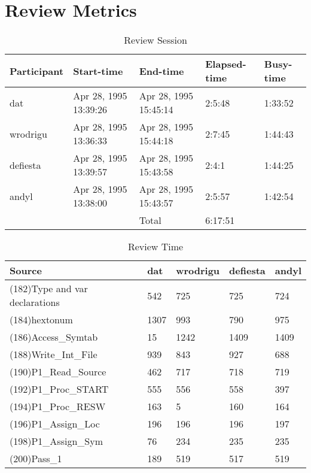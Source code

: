\section{Review Metrics}
\begin{table}[hb]
\begin{center}
\begin{tabular}{|l|l|l|l|l|}
\hline
Participant & Start-time & End-time & Elapsed-time & Busy-time \\
\hline
dat & Apr 28, 1995 13:39:26 & Apr 28, 1995 15:45:14 & 2:5:48 & 1:33:52 \\
wrodrigu & Apr 28, 1995 13:36:33 & Apr 28, 1995 15:44:18 & 2:7:45 & 1:44:43 \\
defiesta & Apr 28, 1995 13:39:57 & Apr 28, 1995 15:43:58 & 2:4:1 & 1:44:25 \\
andyl & Apr 28, 1995 13:38:00 & Apr 28, 1995 15:43:57 & 2:5:57 & 1:42:54 \\
\hline
 & & Total & 6:17:51 & \\
\hline
\end{tabular}
\end{center}
\caption{Review Session}
\end{table}


\begin{table}[hb]
\begin{center}
\begin{tabular}{|l|l|l|l|l|}
\hline
Source & dat & wrodrigu & defiesta & andyl\\
\hline
(182)Type and var declarations & 542 & 725 & 725 & 724\\
(184)hextonum & 1307 & 993 & 790 & 975\\
(186)Access\_Symtab & 15 & 1242 & 1409 & 1409\\
(188)Write\_Int\_File & 939 & 843 & 927 & 688\\
(190)P1\_Read\_Source & 462 & 717 & 718 & 719\\
(192)P1\_Proc\_START & 555 & 556 & 558 & 397\\
(194)P1\_Proc\_RESW & 163 & 5 & 160 & 164\\
(196)P1\_Assign\_Loc & 196 & 196 & 196 & 197\\
(198)P1\_Assign\_Sym & 76 & 234 & 235 & 235\\
(200)Pass\_1 & 189 & 519 & 517 & 519\\
\hline
\end{tabular}
\end{center}
\caption{Review Time}
\end{table}


